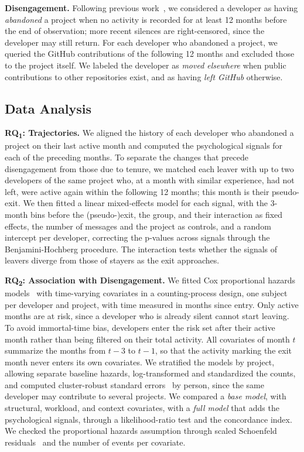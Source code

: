 \textbf{Disengagement.} Following previous work~\cite{calefato2022will,lin2017developer}, we considered a developer as having \textit{abandoned} a project when no activity is recorded for at least 12 months before the end of observation; more recent silences are right-censored, since the developer may still return. For each developer who abandoned a project, we queried the GitHub contributions of the following 12 months and excluded those to the project itself. We labeled the developer as \textit{moved elsewhere} when public contributions to other repositories exist, and as having \textit{left GitHub} otherwise.

\subsection{Data Analysis}
\label{subsec:analysis}

\textbf{RQ\textsubscript{1}: Trajectories.} We aligned the history of each developer who abandoned a project on their last active month and computed the psychological signals for each of the preceding  months. To separate the changes that precede disengagement from those due to tenure, we matched each leaver with up to two developers of the same project who, at a month with similar experience, had not left, \ie were active again within the following 12 months; this month is their pseudo-exit. We then fitted a linear mixed-effects model for each signal, with the 3-month bins before the (pseudo-)exit, the group, and their interaction as fixed effects, the number of messages and the project as controls, and a random intercept per developer, correcting the p-values across signals through the Benjamini-Hochberg procedure. The interaction tests whether the signals of leavers diverge from those of stayers as the exit approaches.

\textbf{RQ\textsubscript{2}: Association with Disengagement.} We fitted Cox proportional hazards models~\cite{cox1972regression} with time-varying covariates in a counting-process design, \ie one subject per developer and project, with time measured in months since entry. Only active months are at risk, since a developer who is already silent cannot start leaving. To avoid immortal-time bias, developers enter the risk set after their  active month rather than being filtered on their total activity. All covariates of month $t$ summarize the months from $t-3$ to $t-1$, so that the activity marking the exit month never enters its own covariates. We stratified the models by project, allowing separate baseline hazards, log-transformed and standardized the counts, and computed cluster-robust standard errors~\cite{lin1989robust} by person, since the same developer may contribute to several projects. We compared a \textit{base model}, with structural, workload, and context covariates, with a \textit{full model} that adds the psychological signals, through a likelihood-ratio test and the concordance index. We checked the proportional hazards assumption through scaled Schoenfeld residuals~\cite{grambsch1994proportional} and the number of events per covariate.

